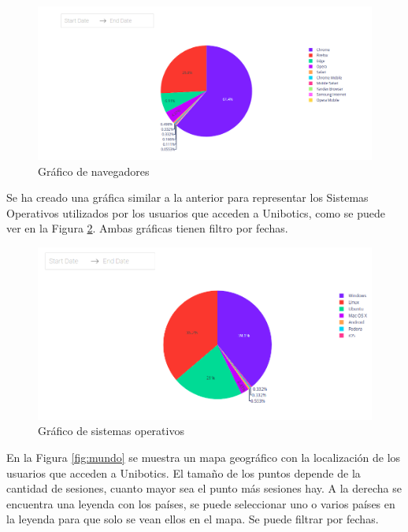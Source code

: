 \begin{figure}[H]
    \centering
    \includegraphics[width=19cm, keepaspectratio]{img/browser.png}
    \caption{Gráfico de navegadores}
    \label{fig:browser}
\end{figure}
\newpage
Se ha creado una gráfica similar a la anterior para representar los Sistemas Operativos utilizados por los usuarios que acceden a Unibotics, como se puede ver en la Figura \ref{fig:os}. Ambas gráficas tienen filtro por fechas.


\begin{figure}[H]
    \centering
    \includegraphics[width=17cm, keepaspectratio]{img/os.png}
    \caption{Gráfico de sistemas operativos}
    \label{fig:os}
\end{figure}
\newpage
En la Figura \ref{fig:mundo} se muestra un mapa geográfico con la localización de los usuarios que acceden a Unibotics. El tamaño de los puntos depende de la cantidad de sesiones, cuanto mayor sea el punto más sesiones hay. A la derecha se encuentra una leyenda con los países, se puede seleccionar uno o varios países en la leyenda para que solo se vean ellos en el mapa. Se puede filtrar por fechas.



